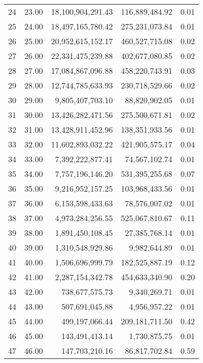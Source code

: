 \begin{table}[ht]
\begin{tabular}{rrrrr}
  24 & 23.00 & 18,100,904,291.43 & 116,889,484.92 & 0.01 \\ 
  25 & 24.00 & 18,497,165,780.42 & 275,231,073.84 & 0.01 \\ 
  26 & 25.00 & 20,952,615,152.17 & 460,527,715.08 & 0.02 \\ 
  27 & 26.00 & 22,331,475,239.88 & 402,677,080.85 & 0.02 \\ 
  28 & 27.00 & 17,084,867,096.88 & 458,220,743.91 & 0.03 \\ 
  29 & 28.00 & 12,744,785,633.93 & 230,718,529.66 & 0.02 \\ 
  30 & 29.00 & 9,805,407,703.10 & 88,820,902.05 & 0.01 \\ 
  31 & 30.00 & 13,426,282,471.56 & 275,500,671.81 & 0.02 \\ 
  32 & 31.00 & 13,428,911,452.96 & 138,351,933.56 & 0.01 \\ 
  33 & 32.00 & 11,602,893,032.22 & 421,905,575.17 & 0.04 \\ 
  34 & 33.00 & 7,392,222,877.41 & 74,567,102.74 & 0.01 \\ 
  35 & 34.00 & 7,757,196,146.20 & 531,395,255.68 & 0.07 \\ 
  36 & 35.00 & 9,216,952,157.25 & 103,968,433.56 & 0.01 \\ 
  37 & 36.00 & 6,153,598,433.63 & 78,576,007.02 & 0.01 \\ 
  38 & 37.00 & 4,973,284,256.55 & 525,067,810.67 & 0.11 \\ 
  39 & 38.00 & 1,891,450,108.45 & 27,385,768.14 & 0.01 \\ 
  40 & 39.00 & 1,310,548,929.86 & 9,982,644.89 & 0.01 \\ 
  41 & 40.00 & 1,506,696,999.79 & 182,525,887.19 & 0.12 \\ 
  42 & 41.00 & 2,287,154,342.78 & 454,633,340.90 & 0.20 \\ 
  43 & 42.00 & 738,677,575.73 & 9,340,269.71 & 0.01 \\ 
  44 & 43.00 & 507,691,045.88 & 4,956,957.22 & 0.01 \\ 
  45 & 44.00 & 499,197,066.44 & 209,181,711.50 & 0.42 \\ 
  46 & 45.00 & 143,491,413.14 & 1,730,875.75 & 0.01 \\ 
  47 & 46.00 & 147,703,210.16 & 86,817,702.84 & 0.59 \\ 
   \hline
\end{tabular}
\end{table}
